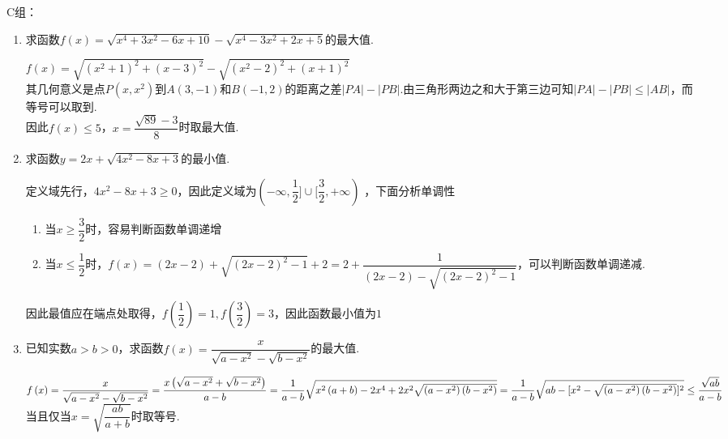 C组：
\begin{enumerate}
    \item 求函数$f\left(x\right) = \sqrt{x^4 + 3x^2 -6x + 10} - \sqrt{x^4 - 3x^2 + 2x + 5}$的最大值.
    \begin{jieda}
        $f\left(x\right) = \sqrt{\left(x^2+1\right)^2 + \left(x-3\right)^2} - \sqrt{\left(x^2-2\right)^2 + \left(x+1\right)^2}$ \\
        其几何意义是点$P\left(x, x^2\right)$到$A\left(3, -1\right)$和$B\left(-1, 2\right)$的距离之差$|PA| - |PB|$.由三角形两边之和大于第三边可知$|PA| - |PB| \leq |AB|$，而等号可以取到.\\
        因此$f\left(x\right) \leq 5$，$x = \dfrac{\sqrt{89}-3}{8}$时取最大值.
    \end{jieda}
    \item 求函数$y = 2x + \sqrt{4x^2-8x+3}$的最小值.
    \begin{jieda}
        定义域先行，$4x^2-8x+3 \geq 0$，因此定义域为$\left(-\infty, \dfrac{1}{2}] \cup [\dfrac{3}{2}, +\infty\right)$ ，下面分析单调性
        \begin{enumerate}
            \item 当$x \geq \dfrac{3}{2}$时，容易判断函数单调递增
            \item 当$x \leq \dfrac{1}{2}$时，$f\left(x\right) = \left(2x-2\right) + \sqrt{\left(2x-2\right)^2-1}+2 = 2 + \dfrac{1}{\left(2x-2\right) - \sqrt{\left(2x-2\right)^2-1}}$，可以判断函数单调递减.
        \end{enumerate}
        因此最值应在端点处取得，$f\left(\dfrac{1}{2}\right) = 1, f\left(\dfrac{3}{2}\right) = 3$，因此函数最小值为$1$
    \end{jieda}
    \item 已知实数$a > b > 0$，求函数$f\left(x\right) = \dfrac{x}{\sqrt{a-x^2}-\sqrt{b-x^2}}$的最大值.
    \begin{jieda}
        $f\left(x\right) = \dfrac{x}{\sqrt{a-x^2}-\sqrt{b-x^2}} = \dfrac{x\left(\sqrt{a-x^2}+\sqrt{b-x^2}\right)}{a-b} \\
        = \dfrac{1}{a-b}\sqrt{x^2\left(a+b\right)-2x^4+2x^2\sqrt{\left(a-x^2\right)\left(b-x^2\right)}} \\
        = \dfrac{1}{a-b}\sqrt{ab - [x^2 - \sqrt{\left(a-x^2\right)\left(b-x^2\right)}]^2} \\
        \leq \dfrac{\sqrt{ab}}{a-b}$
        当且仅当$x = \sqrt{\dfrac{ab}{a+b}}$时取等号.
    \end{jieda}
\end{enumerate}



